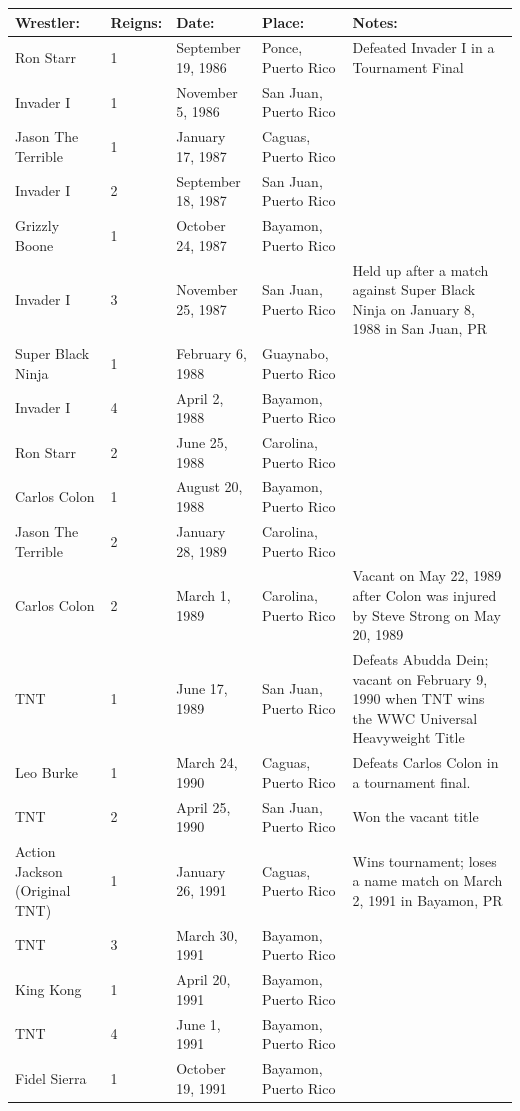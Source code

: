 \documentclass{article}
\begin{document}
\begin{tabular}{lllll}
\toprule
Wrestler: & Reigns: & Date: & Place: & Notes: \\
\midrule
Ron Starr & 1 & September 19, 1986 & Ponce, Puerto Rico & Defeated Invader I in a Tournament Final \\
Invader I & 1 & November 5, 1986 & San Juan, Puerto Rico &  \\
Jason The Terrible & 1 & January 17, 1987 & Caguas, Puerto Rico &  \\
Invader I & 2 & September 18, 1987 & San Juan, Puerto Rico &  \\
Grizzly Boone & 1 & October 24, 1987 & Bayamon, Puerto Rico &  \\
Invader I & 3 & November 25, 1987 & San Juan, Puerto Rico & Held up after a match against Super Black Ninja on January 8, 1988 in San Juan, PR \\
Super Black Ninja & 1 & February 6, 1988 & Guaynabo, Puerto Rico &  \\
Invader I & 4 & April 2, 1988 & Bayamon, Puerto Rico &  \\
Ron Starr & 2 & June 25, 1988 & Carolina, Puerto Rico &  \\
Carlos Colon & 1 & August 20, 1988 & Bayamon, Puerto Rico &  \\
Jason The Terrible & 2 & January 28, 1989 & Carolina, Puerto Rico &  \\
Carlos Colon & 2 & March 1, 1989 & Carolina, Puerto Rico & Vacant on May 22, 1989 after Colon was injured by Steve Strong on May 20, 1989 \\
TNT & 1 & June 17, 1989 & San Juan, Puerto Rico & Defeats Abudda Dein; vacant on February 9, 1990 when TNT wins the WWC Universal Heavyweight Title \\
Leo Burke & 1 & March 24, 1990 & Caguas, Puerto Rico & Defeats Carlos Colon in a tournament final. \\
TNT & 2 & April 25, 1990 & San Juan, Puerto Rico & Won the vacant title \\
Action Jackson (Original TNT) & 1 & January 26, 1991 & Caguas, Puerto Rico & Wins tournament; loses a name match on March 2, 1991 in Bayamon, PR \\
TNT & 3 & March 30, 1991 & Bayamon, Puerto Rico &  \\
King Kong & 1 & April 20, 1991 & Bayamon, Puerto Rico &  \\
TNT & 4 & June 1, 1991 & Bayamon, Puerto Rico &  \\
Fidel Sierra & 1 & October 19, 1991 & Bayamon, Puerto Rico &  \\

\end{tabular}
\end{document}

